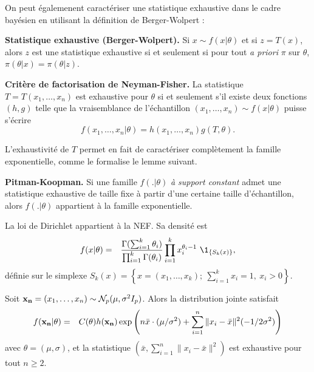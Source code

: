 On peut égalemenent caractériser une statistique exhaustive dans le cadre bayésien en utilisant la définition de Berger-Wolpert :

\begin{definition}{\bf Statistique exhaustive (Berger-Wolpert).}
Si $x\sim f(x|\theta)$ et si $z=T(x)$, alors $z$ est une statistique exhaustive si et seulement si pour tout {\it a priori} $\pi$ sur $\theta$, $\pi(\theta|x)=\pi(\theta|z)$.  
\end{definition}

\begin{definition}{\bf Critère de factorisation de Neyman-Fisher.}
La statistique $T=T(x_1,\ldots,x_n)$ est exhaustive pour $\theta$ si et seulement s'il existe deux fonctions $(h,g)$ telle que la vraisemblance de l'échantillon $(x_1,\ldots,x_n)\sim f(x|\theta)$ puisse s'écrire
$$
f(x_1,\ldots,x_n|\theta) = h(x_1,\ldots,x_n) g(T,\theta).
$$
\end{definition}

L'exhaustivité de $T$ permet en fait de caractériser complètement la famille exponentielle, comme le formalise le lemme suivant.

\begin{lemma}{\bf Pitman-Koopman.}
Si une famille $f(.|\theta)$ \emph{à support constant}  
admet une statistique exhaustive de taille fixe à partir d'une certaine taille d'échantillon, alors $f(.|\theta)$ appartient à la famille exponentielle. 
\end{lemma}

\begin{exo}
La loi de Dirichlet appartient à la NEF. Sa densité est
\begin{eqnarray*}
f(x|\theta) & = & \frac{\Gamma(\sum_{i=1}^k \theta_i)}{\prod_{i=1}^k \Gamma(\theta_i)}\prod\limits_{i=1}^k x^{\theta_i-1}_i \ \1_{\{S_k(x)\}},
\end{eqnarray*}  
définie sur le simplexe $S_k(x)=\left\{x=(x_1,\ldots,x_k); \ \sum\limits_{i=1}^k x_i  =  1, \ x_i>0\right\}$.\\
\end{exo}

\begin{exo}
Soit ${\bf x_n}=(x_1,\ldots,x_n)\sim{\cal{N}}_p(\mu,\sigma^2 I_p)$. Alors la distribution jointe satisfait
\begin{eqnarray*}
f({\bf x_n}|\theta) & = & C(\theta)h({\bf x_n})\exp\left(n\bar{x}\cdot (\mu/\sigma^2) + \sum\limits_{i=1}^n \|x_i-\bar{x}\|^2(-1/2\sigma^2)\right)
\end{eqnarray*}  
avec $\theta=(\mu,\sigma)$, et la statistique $(\bar{x},\sum_{i=1}^n \|x_i-\bar{x}\|^2)$ est exhaustive pour tout $n\geq 2$. \\
\end{exo}

